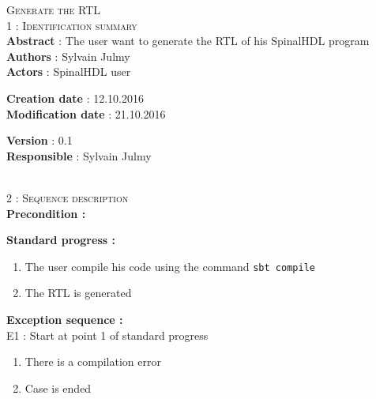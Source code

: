 \begin{flushleft}
    \textsc{\huge Generate the RTL}\\[0.5cm]

    \BlackLine
    \textsc{\Large 1 : Identification summary}\\[0.3cm]

        \textbf{\large Abstract} : The user want to generate the RTL of his SpinalHDL program\\[0.1cm]

        \textbf{\large Authors} : Sylvain Julmy \\[0.3cm]			

        \textbf{\large Actors} : SpinalHDL user \\[0.1cm]	
    \begin{minipage}{0.40\textwidth}
        \begin{flushleft}	
            \textbf{\large Creation date} : 12.10.2016 \\[0.1cm]

            \textbf{\large Modification date} : 21.10.2016 \\[0.1cm]
        \end{flushleft}
    \end{minipage}
    \begin{minipage}{0.40\textwidth}
        \begin{flushleft}
            \textbf{\large Version} : 0.1 \\[0.1cm]

            \textbf{\large Responsible} : Sylvain Julmy \\[0.1cm]
        \end{flushleft}
    \end{minipage}
    \\[0.5cm]
    \BlackLine
    \textsc{\Large 2 : Sequence description}\\[0.3cm]

    \textbf{\large Precondition :}

    \textbf{\large  Standard progress :}
    \begin{enumerate}[nosep]
        \item The user compile his code using the command \verb|sbt compile|
        \item The RTL is generated
    \end{enumerate}

    \textbf{\large  Exception sequence :}\\
    E1 : Start at point 1 of standard progress
    \begin{enumerate}[nosep]
        \item There is a compilation error
        \item Case is ended
    \end{enumerate}


\end{flushleft}

